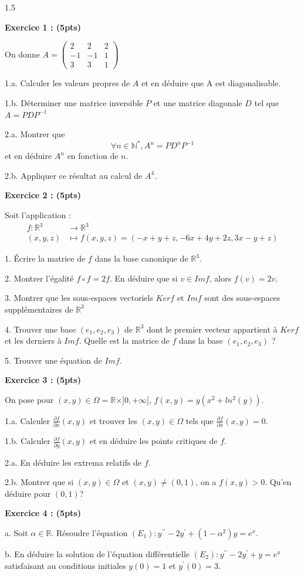 \documentclass[12pt]{article}
\begin{document}
\begin{spacing}{1.5}

\textbf{Exercice 1 : (5pts)}

On donne $A=\begin{pmatrix}
2 & 2& 2 \\ 
-1 & -1 & 1 \\ 
3 & 3 & 1
\end{pmatrix} $

1.a. Calculer les valeurs propres de $A$ et en déduire que A est diagonalisable.

1.b. Déterminer une matrice inversible $P$ et une matrice diagonale $D$ tel que $A=PDP^{-1}$

2.a. Montrer que 
\[
\forall {n\in\mathbb{N}^*}, A^n = PD^nP^{-1}
\]
et en déduire $A^n$ en fonction de $n$.

2.b. Appliquer ce résultat au  calcul de $A^4$.

\textbf{Exercice 2 : (5pts)}

Soit l'application : 
\begin{align*}
f:\mathbb{R}^3 &\longrightarrow \mathbb{R}^3\\
(x,y,z) &\longmapsto f(x,y,z)=(-x+y+z, -6x+4y+2z, 3x-y+z)
\end{align*} 

1. Écrire la matrice de $f$ dans la base canonique de $\mathbb{R}^3$.

2. Montrer l'égalité $f\circ f= 2f$. En déduire que si $v\in Imf$, alors $f(v)=2v$.

3. Montrer que les sous-espaces vectoriels $Kerf$ et $Imf$ sont des sous-espaces supplémentaires de $\mathbb{R}^3$

4. Trouver une base $(e_1,e_2,e_3)$ de $\mathbb{R}^3$ dont le premier vecteur appartient à $Kerf$ et les derniers à $Imf$. Quelle est la matrice de $f$ dans la base $(e_1,e_2,e_3)$ ?

5. Trouver une équation de $Imf$.

\textbf{Exercice 3 : (5pts)}

On pose pour $(x,y)\in\Omega=\mathbb{R}\times]0,+\infty[$,  $f(x,y)=y(x^2 + ln^2{(y)})$.

1.a. Calculer $\frac{\partial{f}}{\partial{x}}(x,y)$ et trouver les $(x,y)\in\Omega$ tels que $\frac{\partial{f}}{\partial{x}}(x,y) = 0$.

1.b. Calculer $\frac{\partial{f}}{\partial{y}}(x,y)$ et en déduire les points critiques de $f$.

2.a. En déduire les extrema relatifs de $f$.

2.b. Montrer que si $(x,y)\in\Omega$ et $(x,y)\neq(0,1)$, on a $f(x,y)>0$. Qu'en déduire pour $(0,1)$?

\textbf{Exercice 4 : (5pts)}

a. Soit $\alpha\in \mathbb{R}$. Résoudre l'équation $(E_1):y^{\prime\prime} -2y^{\prime} +(1-\alpha^2)y=e^x$.

b. En déduire la solution de l'équation différentielle $(E_2):y^{\prime\prime} -2y^{\prime}+y=e^x$ satisfaisant au conditions initiales $y(0)=1$ et $y^\prime(0)=3$.

\medskip

\end{spacing}
\end{document}
